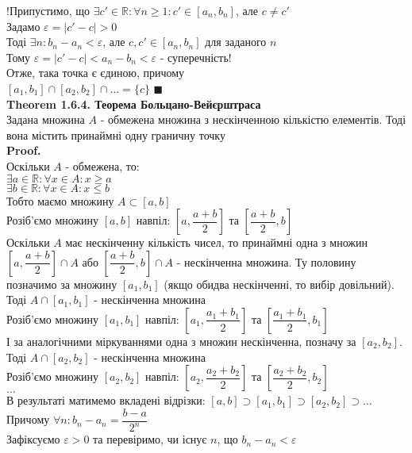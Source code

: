 \documentclass[a4paper, 14pt]{extarticle}
\def\bigline{\vspace{5mm}\\}
\def\th#1{\textbf{Theorem {#1}}}
\def\proof{\textbf{Proof.}\\}
\def\bigline{\vspace{5mm}\\}
\def\qed{$\blacksquare$}
\begin{document}
	!Припустимо, що $\exists c' \in \mathbb{R}: \forall n \geq 1: c' \in [a_n,b_n]$, але $c \neq c'$\\
	Задамо $\varepsilon = |c' - c| > 0$\\
	Тоді $\exists n: b_n - a_n < \varepsilon$, але $c,c' \in [a_n,b_n]$ для заданого $n$\\
	Тому $\varepsilon = |c'-c| < a_n-b_n < \varepsilon$ - суперечність!\\
	Отже, така точка є єдиною, причому\\
	$[a_1, b_1] \cap [a_2, b_2] \cap \dots = \{c\}$ \qed
	\bigline
	\th{1.6.4. Теорема Больцано-Вейєрштраса}\\
	Задана множина $A$ - обмежена множина з нескінченною кількістю елементів. Тоді вона містить принаймні одну граничну точку\\
	\proof
	Оскільки $A$ - обмежена, то:\\
	$\exists a \in \mathbb{R}: \forall x \in A: x \geq a$\\
	$\exists b \in \mathbb{R}: \forall x \in A: x \leq b$\\
	Тобто маємо множину $A \subset [a,b]$\\
	Розіб'ємо множину $[a,b]$ навпіл: $\left[a, \dfrac{a+b}{2}\right]$ та $\left[\dfrac{a+b}{2},b \right]$\\
	Оскільки $A$ має нескінченну кількість чисел, то принаймні одна з множин $\left[a, \dfrac{a+b}{2}\right] \cap A$ або $\left[\dfrac{a+b}{2}, b\right] \cap A$ - нескінченна множина. Ту половину позначимо за множину $[a_1,b_1]$ (якщо обидва нескінченні, то вибір довільний). Тоді $A \cap [a_1,b_1]$ - нескінченна множина\\
	Розіб'ємо множину $[a_1,b_1]$ навпіл: $\left[a_1, \dfrac{a_1+b_1}{2}\right]$ та $\left[\dfrac{a_1+b_1}{2},b_1 \right]$\\
	І за аналогічними міркуваннями одна з множин нескінченна, позначу за $[a_2,b_2]$. Тоді $A \cap [a_2,b_2]$ - нескінченна множина\\
	Розіб'ємо множину $[a_2,b_2]$ навпіл: $\left[a_2, \dfrac{a_2+b_2}{2}\right]$ та $\left[\dfrac{a_2+b_2}{2},b_2 \right]$\\
	$\dots$\\
	В результаті матимемо вкладені відрізки: $[a,b] \supset [a_1,b_1] \supset [a_2,b_2] \supset \dots$\\
	Причому $\forall n: b_n - a_n = \dfrac{b-a}{2^n}$\\
	Зафіксуємо $\varepsilon > 0$ та перевіримо, чи існує $n$, що $b_n - a_n < \varepsilon$\\
\end{document}
